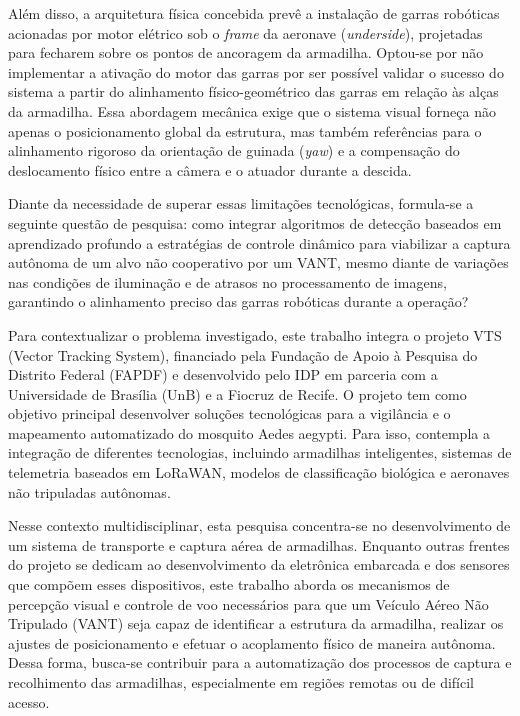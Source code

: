 Além disso, a arquitetura física concebida prevê a instalação de garras robóticas acionadas por motor elétrico sob o \textit{frame} da aeronave (\textit{underside}), projetadas para fecharem sobre os pontos de ancoragem da armadilha. Optou-se por não implementar a ativação do motor das garras por ser possível validar o sucesso do sistema a partir do alinhamento físico-geométrico das garras em relação às alças da armadilha. Essa abordagem mecânica exige que o sistema visual forneça não apenas o posicionamento global da estrutura, mas também referências para o alinhamento rigoroso da orientação de guinada (\textit{yaw}) e a compensação do deslocamento físico entre a câmera e o atuador durante a descida.

Diante da necessidade de superar essas limitações tecnológicas, formula-se a seguinte questão de pesquisa: como integrar algoritmos de detecção baseados em aprendizado profundo a estratégias de controle dinâmico para viabilizar a captura autônoma de um alvo não cooperativo por um VANT, mesmo diante de variações nas condições de iluminação e de atrasos no processamento de imagens, garantindo o alinhamento preciso das garras robóticas durante a operação?

Para contextualizar o problema investigado, este trabalho integra o projeto VTS (Vector Tracking System), financiado pela Fundação de Apoio à Pesquisa do Distrito Federal (FAPDF) e desenvolvido pelo IDP em parceria com a Universidade de Brasília (UnB) e a Fiocruz de Recife. O projeto tem como objetivo principal desenvolver soluções tecnológicas para a vigilância e o mapeamento automatizado do mosquito Aedes aegypti. Para isso, contempla a integração de diferentes tecnologias, incluindo armadilhas inteligentes, sistemas de telemetria baseados em LoRaWAN, modelos de classificação biológica e aeronaves não tripuladas autônomas.

Nesse contexto multidisciplinar, esta pesquisa concentra-se no desenvolvimento de um sistema de transporte e captura aérea de armadilhas. Enquanto outras frentes do projeto se dedicam ao desenvolvimento da eletrônica embarcada e dos sensores que compõem esses dispositivos, este trabalho aborda os mecanismos de percepção visual e controle de voo necessários para que um Veículo Aéreo Não Tripulado (VANT) seja capaz de identificar a estrutura da armadilha, realizar os ajustes de posicionamento e efetuar o acoplamento físico de maneira autônoma. Dessa forma, busca-se contribuir para a automatização dos processos de captura e recolhimento das armadilhas, especialmente em regiões remotas ou de difícil acesso.

